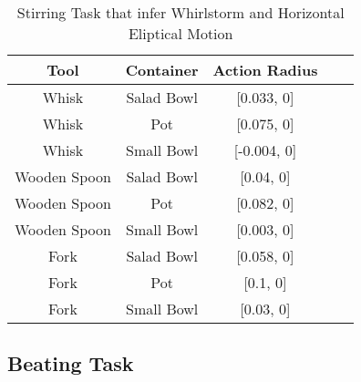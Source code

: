 \begin{table}[H]
    \centering
    \begin{tabular}{|c|c|c|c|c|}
    \hline
    \textbf{Tool} & \textbf{Container} & \textbf{Action Radius}\\
    \hline
    Whisk & Salad Bowl & [0.033, 0] \\
    \hline
    Whisk & Pot & [0.075, 0] \\
    \hline
    Whisk & Small Bowl & [-0.004, 0]\\
    \hline
    Wooden Spoon & Salad Bowl & [0.04, 0] \\
    \hline
    Wooden Spoon & Pot & [0.082, 0] \\
    \hline
    Wooden Spoon & Small Bowl & [0.003, 0] \\
    \hline
    Fork & Salad Bowl & [0.058, 0] \\
    \hline
    Fork & Pot & [0.1, 0] \\
    \hline
    Fork & Small Bowl & [0.03, 0] \\
    \hline
\end{tabular}
\caption{Stirring Task that infer Whirlstorm and Horizontal Eliptical Motion}

\end{table}

\subsection{Beating Task}
